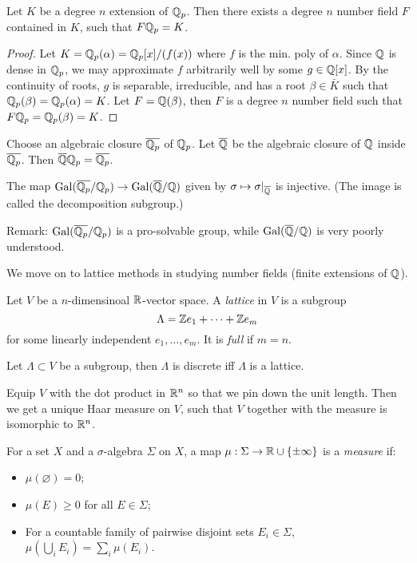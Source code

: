 \documentclass[11pt]{amsart}
\begin{document}
\begin{cor}
Let $K$ be a degree $n$ extension of $\mathbb{Q}_p$. Then there exists a degree $n$ number field $F$ contained in $K$, such that $F\mathbb{Q}_p = K$.
\end{cor}

\begin{proof}
Let $K = \mathbb{Q}_p(\alpha) = \mathbb{Q}_p[x]/(f(x))$ where $f$ is the min. poly of $\alpha$. Since $\mathbb{Q}$ is dense in $\mathbb{Q}_p$, we may approximate $f$ arbitrarily well by some $g\in \mathbb{Q}[x]$. By the continuity of roots, $g$ is separable, irreducible, and has a root $\beta\in \bar{K}$ such that $\mathbb{Q}_p(\beta) = \mathbb{Q}_p(\alpha) = K$. Let $F = \mathbb{Q}(\beta)$, then $F$ is a degree $n$ number field such that $F\mathbb{Q}_p = \mathbb{Q}_p(\beta) = K$.
\end{proof}

\begin{cor}
Choose an algebraic closure $\overline{\mathbb{Q}_p}$ of $\mathbb{Q}_p$. Let $\overline{\mathbb{Q}}$ be the algebraic closure of $\mathbb{Q}$ inside $\overline{\mathbb{Q}_p}$. Then $\overline{\mathbb{Q}}\mathbb{Q}_p = \overline{\mathbb{Q}_p}$.
\end{cor}

\begin{cor}
The map $\operatorname{Gal}(\overline{\mathbb{Q}_p}/\mathbb{Q}_p) \to \operatorname{Gal}(\overline{\mathbb{Q}}/\mathbb{Q})$ given by $\sigma \mapsto \sigma|_{\overline{\mathbb{Q}}}$ is injective. (The image is called the decomposition subgroup.)
\end{cor}

Remark: $\operatorname{Gal}(\overline{\mathbb{Q}_p}/\mathbb{Q}_p)$ is a pro-solvable group, while $\operatorname{Gal}(\overline{\mathbb{Q}}/\mathbb{Q})$ is very poorly understood.



We move on to lattice methods in studying number fields (finite extensions of $\mathbb{Q}$).

\begin{defn}
Let $V$ be a $n$-dimensinoal $\mathbb{R}$-vector space. A \emph{lattice} in $V$ is a subgroup
\[\Lambda = \mathbb{Z} e_1 + \dots + \mathbb{Z} e_m\]
for some linearly independent $e_1,\dots,e_m$. It is \emph{full} if $m=n$.
\end{defn}

\begin{prop}
Let $\Lambda \subset V$ be a subgroup, then $\Lambda$ is discrete iff $\Lambda$ is a lattice.
\end{prop}

Equip $V$ with the dot product in $\mathbb{R}^n$ so that we pin down the unit length. Then we get a unique Haar measure on $V$, such that $V$ together with the measure is isomorphic to $\mathbb{R}^n$.

\begin{defn}
For a set $X$ and a $\sigma$-algebra $\Sigma$ on $X$, a map $\mu: \Sigma \to \mathbb{R}\cup\{\pm\infty\}$ is a \emph{measure} if:
\begin{itemize}
    \item $\mu(\varnothing) = 0$;
    \item $\mu(E) \ge 0$ for all $E\in \Sigma$;
    \item For a countable family of pairwise disjoint sets $E_i\in \Sigma$, $\mu(\bigcup_i E_i) = \sum_i\mu(E_i)$.
\end{itemize}
\end{defn}
\end{document}
